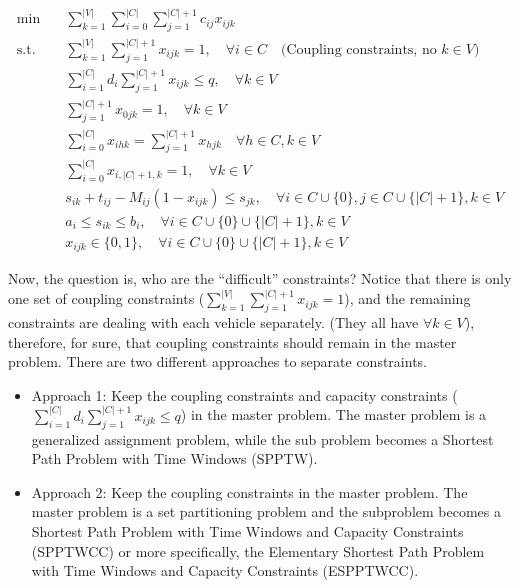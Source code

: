         \begin{align*}
            \min \quad & \sum_{k = 1}^{|V|}\sum_{i = 0}^{|C|}\sum_{j = 1}^{|C| + 1} c_{ij} x_{ijk}\\
            \text{s.t.} \quad & \sum_{k = 1}^{|V|}\sum_{j = 1}^{|C| + 1} x_{ijk} = 1, \quad \forall i \in C \quad \text{(Coupling constraints, no $k \in V$)}\\
            & \sum_{i = 1}^{|C|} d_i \sum_{j = 1}^{|C| + 1} x_{ijk} \le q, \quad \forall k \in V \\
            & \sum_{j = 1}^{|C| + 1} x_{0jk} = 1, \quad \forall k \in V\\
            & \sum_{i = 0}^{|C|} x_{ihk} = \sum_{j = 1}^{|C| + 1} x_{hjk} \quad \forall h \in C, k \in V\\
            & \sum_{i = 0}^{|C|} x_{i, |C|+1, k} = 1, \quad \forall k \in V\\
            & s_{ik} + t_{ij} - M_{ij} (1 - x_{ijk}) \le s_{jk}, \quad \forall i \in C \cup \{0\}, j \in C \cup \{|C| + 1\}, k \in V\\
            & a_i \le s_{ik} \le b_i, \quad \forall i \in C \cup \{0\} \cup \{|C| + 1\}, k \in V\\
            & x_{ijk} \in \{0, 1\}, \quad \forall i \in C \cup \{0\} \cup \{|C| + 1\}, k \in V
        \end{align*}

        Now, the question is, who are the ``difficult'' constraints? Notice that there is only one set of coupling constraints ($\sum_{k = 1}^{|V|}\sum_{j = 1}^{|C| + 1} x_{ijk} = 1$), and the remaining constraints are dealing with each vehicle separately. (They all have $\forall k \in V$), therefore, for sure, that coupling constraints should remain in the master problem. There are two different approaches to separate constraints.

        \begin{itemize}
            \item Approach 1: Keep the coupling constraints and capacity constraints ($\sum_{i = 1}^{|C|} d_i \sum_{j = 1}^{|C| + 1} x_{ijk} \le q$) in the master problem. The master problem is a generalized assignment problem, while the sub problem becomes a Shortest Path Problem with Time Windows (SPPTW).
            \item Approach 2: Keep the coupling constraints in the master problem. The master problem is a set partitioning problem and the subproblem becomes a Shortest Path Problem with Time Windows and Capacity Constraints (SPPTWCC) or more specifically, the Elementary Shortest Path Problem with Time Windows and Capacity Constraints (ESPPTWCC). 
        \end{itemize}

